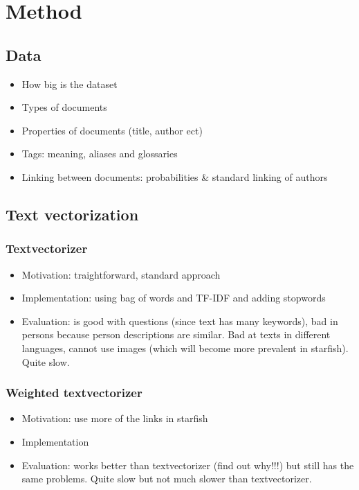 \section{Method}
\subsection{Data}
\begin{itemize}
\item How big is the dataset
\item Types of documents
\item Properties of documents (title, author ect)
\item Tags: meaning, aliases and glossaries
\item Linking between documents: probabilities \& standard linking of authors
\end{itemize}

\subsection{Text vectorization}
\subsubsection{Textvectorizer}
\begin{itemize}
\item Motivation: traightforward, standard approach
\item Implementation: using bag of words and TF-IDF and adding stopwords
\item Evaluation: is good with questions (since text has many keywords), bad in persons because person descriptions are similar. Bad at texts in different languages, cannot use images (which will become more prevalent in starfish). Quite slow. 
\end{itemize}
\subsubsection{Weighted textvectorizer}
\begin{itemize}
\item Motivation: use more of the links in starfish
\item Implementation
\item Evaluation: works better than textvectorizer (find out why!!!) but still has the same problems. Quite slow but not much slower than textvectorizer. 
\end{itemize}

